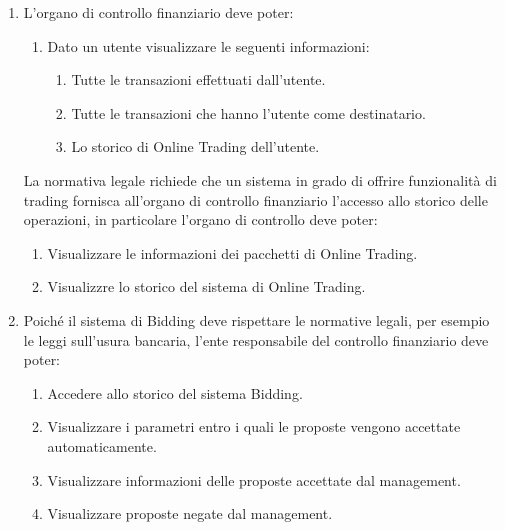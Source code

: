 \begin{enumerate}
	\item L'organo di controllo finanziario deve poter:
	\begin{enumerate}
    	\item Dato un utente visualizzare le seguenti informazioni:
        	\begin{enumerate}
	            \item Tutte le transazioni effettuati dall'utente.
    	        \item Tutte le transazioni che hanno l'utente come destinatario.
	            \item Lo storico di Online Trading dell'utente.
    	    \end{enumerate}
	\end{enumerate}
	La normativa legale richiede che un sistema in grado di offrire funzionalit\`a di trading fornisca all'organo di controllo finanziario l'accesso allo storico delle operazioni, in particolare l'organo di controllo deve poter:
	\begin{enumerate}
    	\item Visualizzare le informazioni dei pacchetti di Online Trading.
    	\item Visualizzre lo storico del sistema di Online Trading.
	\end{enumerate}

	\item Poich\'e il sistema di Bidding deve rispettare le normative legali, per esempio le leggi sull'usura bancaria, l'ente responsabile del controllo finanziario deve poter:
	\begin{enumerate}
    	\item Accedere allo storico del sistema Bidding.
    	\item Visualizzare i parametri entro i quali le proposte vengono accettate automaticamente.
    	\item Visualizzare informazioni delle proposte accettate dal management.
    	\item Visualizzare proposte negate dal management.
	\end{enumerate}

\end{enumerate}





